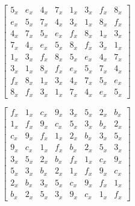 \begin{equation}\label{mat:whirlwind-m1}
\begin{bmatrix}
5_x & e_x & 4_x & 7_x & 1_x & 3_x & f_x & 8_x\\
e_x & 5_x & 7_x & 4_x & 3_x & 1_x & 8_x & f_x\\
4_x & 7_x & 5_x & e_x & f_x & 8_x & 1_x & 3_x\\
7_x & 4_x & e_x & 5_x & 8_x & f_x & 3_x & 1_x\\
1_x & 3_x & f_x & 8_x & 5_x & e_x & 4_x & 7_x\\
3_x & 1_x & 8_x & f_x & e_x & 5_x & 7_x & 4_x\\
f_x & 8_x & 1_x & 3_x & 4_x & 7_x & 5_x & e_x\\
8_x & f_x & 3_x & 1_x & 7_x & 4_x & e_x & 5_x
\end{bmatrix}
\end{equation}

\begin{equation}\label{mat:whirlwind-m1-inv}
\begin{bmatrix}
f_x & 1_x & c_x & 9_x & 3_x & 5_x & 2_x & b_x\\
1_x & f_x & 9_x & c_x & 5_x & 3_x & b_x & 2_x\\
c_x & 9_x & f_x & 1_x & 2_x & b_x & 3_x & 5_x\\
9_x & c_x & 1_x & f_x & b_x & 2_x & 5_x & 3_x\\
3_x & 5_x & 2_x & b_x & f_x & 1_x & c_x & 9_x\\
5_x & 3_x & b_x & 2_x & 1_x & f_x & 9_x & c_x\\
2_x & b_x & 3_x & 5_x & c_x & 9_x & f_x & 1_x\\
b_x & 2_x & 5_x & 3_x & 9_x & c_x & 1_x & f_x
\end{bmatrix}
\end{equation}
